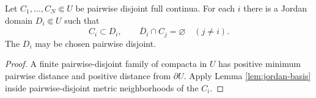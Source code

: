 \begin{corollary}\label{cor:isolating-disks}
Let \(C_1,\dots,C_N\Subset U\) be pairwise disjoint full continua.  For each \(i\) there is a Jordan domain \(D_i\Subset U\) such that
\[
 C_i\subset D_i,\qquad \overline D_i\cap C_j=\varnothing\quad(j\ne i).  \tag{3.3}
\]
The \(D_i\) may be chosen pairwise disjoint.
\end{corollary}

\begin{proof}
A finite pairwise-disjoint family of compacta in \(U\) has positive minimum pairwise distance and positive distance from \(\partial U\).  Apply Lemma \ref{lem:jordan-basis} inside pairwise-disjoint metric neighborhoods of the \(C_i\).
\end{proof}
